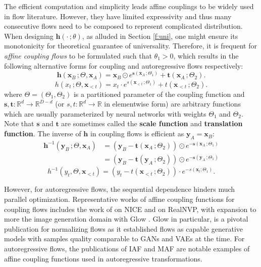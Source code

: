 The efficient computation and simplicity leads affine couplings to be widely
used in flow literature. However, they have limited expressivity and thus
many consecutive flows need to be composed to represent complicated
distribution. When designing $\mathbf{h}(\cdot\,;\theta)$, as alluded in Section
\ref{f:uni}, one might ensure its monotonicity for theoretical guarantee of
universality. Therefore, it is frequent for \textit{affine coupling
flows} to be formulated such that $\theta_1 > 0$, which results in the following alternative forms for coupling and autoregressive flows respectively:
$$
\mathbf{h}(\mathbf{x}_B\,;\Theta, \mathbf{x}_A) = \mathbf{x}_B \odot e^{\mathbf{s}(\mathbf{x}_A\,;\Theta_1)} +
\mathbf{t}(\mathbf{x}_A\,;\Theta_2)
.$$
$$
h(x_t\,;\Theta, \mathbf{x}_{<t}) = x_t \cdot e^{s(\mathbf{x}_{<t}\,;\Theta_1)} +
t(\mathbf{x}_{<t}\,;\Theta_2)
.$$
where $\Theta = (\Theta_1, \Theta_2)$ is a partitioned parameter of the
coupling function and $\mathbf{s}, \mathbf{t}: \mathbb{R}^d \to \mathbb{R}^{D-d}$
(or $s, t: \mathbb{R}^d \to \mathbb{R}$ in elementwise form) are
arbitrary functions which are usually parameterized by neural networks with
weights $\Theta_1$ and $\Theta_2$.
Note that $\mathbf{s}$ and $\mathbf{t}$ are sometimes called the \textbf{scale
function} and \textbf{translation function}. The inverse of $\mathbf{h}$ in coupling flows is
efficient as $\mathbf{y}_A = \mathbf{x}_B$:
\begin{align*}
  \mathbf{h}^{-1}(\mathbf{y}_B\,;\Theta, \mathbf{x}_A)
  &= (\mathbf{y}_B - \mathbf{t}(\mathbf{x}_A\,;\Theta_2)) \odot
  e^{-\mathbf{s}(\mathbf{x}_A\,;\Theta_1)} \\
  &= (\mathbf{y}_B -
  \mathbf{t}(\mathbf{y}_A\,;\Theta_2)) \odot e^{-\mathbf{s}(\mathbf{y}_A\,;\Theta_1)}
\end{align*}
$$
  h^{-1}(y_t, \Theta, \mathbf{x}_{<t}) = (y_t - t(\mathbf{x}_{<t}\,;\Theta_2)) \cdot
  e^{-s(\mathbf{x}_{t}; \Theta_1)}
.$$

However, for autoregressive flows, the sequential dependence hinders much
parallel optimization. Representative works of affine coupling functions for
coupling flows includes the work of \citep{dinhNICENonlinearIndependent2015} on
NICE and \citep{dinhDensityEstimationUsing2017} on RealNVP, with expansion to
more the image generation domain with Glow \citep{kingmaGlowGenerativeFlow2018}.
Glow in particular, is a pivotal publication for normalizing flows as it
established flows as capable generative models with samples quality comparable
to GANs and VAEs at the time. For autoregressive flows, the publications of IAF
and MAF \citep{kingmaImprovedVariationalInference2016,
papamakariosMaskedAutoregressiveFlow2017} are notable examples of affine
coupling functions used in autoregressive transformations.

